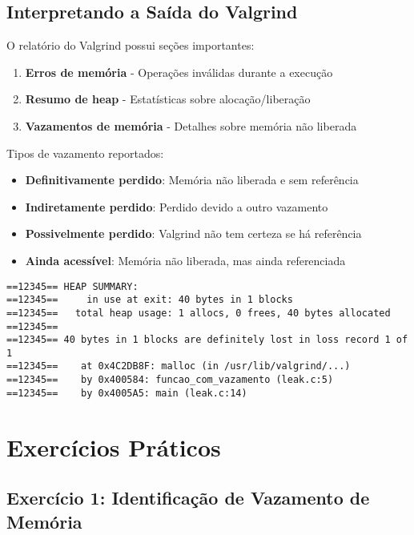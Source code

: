\documentclass[11pt,a4paper]{article}
\begin{document}
\subsection{Interpretando a Saída do Valgrind}

O relatório do Valgrind possui seções importantes:

\begin{enumerate}
    \item \textbf{Erros de memória} - Operações inválidas durante a execução
    \item \textbf{Resumo de heap} - Estatísticas sobre alocação/liberação 
    \item \textbf{Vazamentos de memória} - Detalhes sobre memória não liberada
\end{enumerate}

Tipos de vazamento reportados:
\begin{itemize}
    \item \textbf{Definitivamente perdido}: Memória não liberada e sem referência
    \item \textbf{Indiretamente perdido}: Perdido devido a outro vazamento
    \item \textbf{Possivelmente perdido}: Valgrind não tem certeza se há referência
    \item \textbf{Ainda acessível}: Memória não liberada, mas ainda referenciada
\end{itemize}

\begin{tcolorbox}[colback=lightblue!20, colframe=mackblue, title=Exemplo de Saída do Valgrind]
\begin{verbatim}
==12345== HEAP SUMMARY:
==12345==     in use at exit: 40 bytes in 1 blocks
==12345==   total heap usage: 1 allocs, 0 frees, 40 bytes allocated
==12345== 
==12345== 40 bytes in 1 blocks are definitely lost in loss record 1 of 1
==12345==    at 0x4C2DB8F: malloc (in /usr/lib/valgrind/...)
==12345==    by 0x400584: funcao_com_vazamento (leak.c:5)
==12345==    by 0x4005A5: main (leak.c:14)
\end{verbatim}
\end{tcolorbox}


\section{Exercícios Práticos}

\subsection{Exercício 1: Identificação de Vazamento de Memória}
\end{document}
